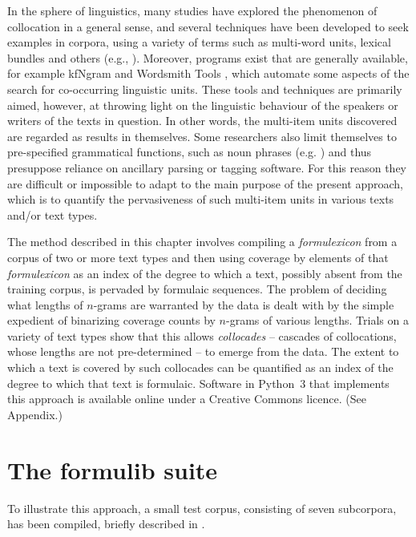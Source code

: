 \documentclass[output=paper]{langscibook}
\begin{document}
In the sphere of linguistics, many studies have explored the phenomenon of collocation in a general sense, and several techniques have been developed to seek examples in corpora, using a variety of terms such as multi-word units, lexical bundles and others (e.g., \citealt{ShimohataEtAl1999,ZhangEtAl2009, KilgarriffEtAl2012}). Moreover, programs exist that are generally available, for example kfNgram \citep{Fletcher2012} and Wordsmith Tools \citep{Scott2020}, which automate some aspects of the search for co-occurring linguistic units. These tools and techniques are primarily aimed, however, at throwing light on the linguistic behaviour of the speakers or writers of the texts in question. In other words, the multi-item units discovered are regarded as results in themselves. Some researchers also limit themselves to pre-specified grammatical functions, such as noun phrases (e.g. \citealt{Daille2003,ZhangEtAl2009}) and thus presuppose reliance on ancillary parsing or tagging software. For this reason they are difficult or impossible to adapt to the main purpose of the present approach, which is to quantify the pervasiveness of such multi-item units in various texts and\slash or text types.

The method described in this chapter involves compiling a \textit{formulexicon} from a corpus of two or more text types and then using coverage by elements of that \textit{formulexicon} as an index of the degree to which a text, possibly absent from the training corpus, is pervaded by formulaic sequences. The problem of deciding what lengths of $n$-grams are warranted by the data is dealt with by the simple expedient of binarizing coverage counts by $n$-grams of various lengths. Trials on a variety of text types show that this allows \textit{collocades} -- cascades of collocations, whose lengths are not pre-determined -- to emerge from the data. The extent to which a text is covered by such collocades can be quantified as an index of the degree to which that text is formulaic. Software in Python~3 that implements this approach is available online under a Creative Commons licence. (See Appendix.)

\section{The formulib suite}

To illustrate this approach, a small test corpus, consisting of seven subcorpora, has been compiled, briefly described in .
\end{document}
